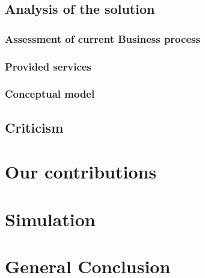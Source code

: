 \documentclass[12pt, a4paper, titlepage]{book}
\begin{document}
    \section{Analysis of the solution}\label{sec:assessment-of-current-state}
    \subsection{Assessment of current Business process}\label{sec:business-process}
    

    \subsection{Provided services}\label{sec:analysis}
    

    \subsection{Conceptual model}\label{sec:conceptual-model}
    

    \section{Criticism}\label{sec:criticism}
    

    \chapter{Our contributions}\label{sec:implementation}
    

    \chapter{Simulation}\label{sec:simulation}
    

    \chapter{General Conclusion}\label{sec:conclusion}
    

    \backmatter

    \printbibliography[title=References]

    \appendix
\end{document}
